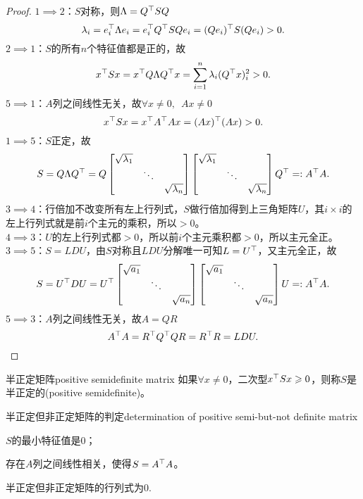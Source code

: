 \begin{proof}
	$1\implies 2$：$S$对称，则$\Lambda=Q^\top SQ$
	\[
		\lambda_i=e_i^\top \Lambda e_i=e_i^\top Q^\top SQe_i=(Qe_i)^\top S(Qe_i)>0.
	\]
	$2\implies 1$：$S$的所有$n$个特征值都是正的，故
	\[
		x^\top Sx=x^\top Q\Lambda Q^\top x=\sum_{i=1}^n\lambda_i(Q^\top x)^2_i>0.
	\]
	$5\implies 1$：$A$列之间线性无关，故$\forall x\neq 0,\enspace Ax\neq 0$
	\[
		x^\top Sx=x^\top A^\top Ax=(Ax)^\top(Ax)>0.
	\]
	$1\implies 5$：$S$正定，故
	\[
		S=Q\Lambda Q^\top=Q\begin{bmatrix}
			\sqrt{\lambda_1}\\ &\ddots\\ &&\sqrt{\lambda_n}
		\end{bmatrix}\begin{bmatrix}
			\sqrt{\lambda_1}\\ &\ddots\\ &&\sqrt{\lambda_n}
		\end{bmatrix}Q^\top=:A^\top A.
	\]
	$3\implies 4$：行倍加不改变所有左上行列式，$S$做行倍加得到上三角矩阵$U$，其$i\times i$的左上行列式就是前$i$个主元的乘积，所以$>0$。\\
	$4\implies 3$：$U$的左上行列式都$>0$，所以前$i$个主元乘积都$>0$，所以主元全正。\\
	$3\implies 5$：$S=LDU$，由$S$对称且$LDU$分解唯一可知$L=U^\top$，又主元全正，故
	\[
		S=U^\top DU=U^\top\begin{bmatrix}
			\sqrt{a_1}\\ &\ddots\\ &&\sqrt{a_n}
		\end{bmatrix}\begin{bmatrix}
			\sqrt{a_1}\\ &\ddots\\ &&\sqrt{a_n}
		\end{bmatrix}U=:A^\top A.
	\]
	$5\implies 3$：$A$列之间线性无关，故$A=QR$
	\[
		A^\top A=R^\top Q^\top QR=R^\top R=LDU.
		\qedhere
	\]
\end{proof}
\begin{definition}{半正定矩阵}{positive semidefinite matrix}
	如果$\forall x\neq 0$，二次型$x^\top Sx\geqslant 0$，则称$S$是半正定的(positive semidefinite)。
\end{definition}
\begin{theorem}{半正定但非正定矩阵的判定}{determination of positive semi-but-not definite matrix}
	\begin{compactenum}
		\item $S$的最小特征值是0；
		\item 存在$A$列之间线性相关，使得$S=A^\top A$。
	\end{compactenum}
\end{theorem}
半正定但非正定矩阵的行列式为0.